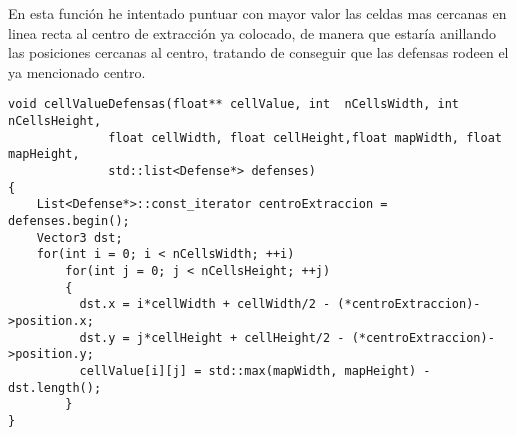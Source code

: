 En esta función he intentado puntuar con mayor valor las celdas mas cercanas en
linea recta al centro de extracción ya colocado, de manera que estaría anillando
las posiciones cercanas al centro, tratando de conseguir que las defensas rodeen
el ya mencionado centro.

\begin{lstlisting}
void cellValueDefensas(float** cellValue, int  nCellsWidth, int nCellsHeight,
              float cellWidth, float cellHeight,float mapWidth, float mapHeight,
              std::list<Defense*> defenses)
{
    List<Defense*>::const_iterator centroExtraccion = defenses.begin();
    Vector3 dst;
    for(int i = 0; i < nCellsWidth; ++i)
        for(int j = 0; j < nCellsHeight; ++j)
        {
          dst.x = i*cellWidth + cellWidth/2 - (*centroExtraccion)->position.x;
          dst.y = j*cellHeight + cellHeight/2 - (*centroExtraccion)->position.y;
          cellValue[i][j] = std::max(mapWidth, mapHeight) - dst.length();
        }
}
\end{lstlisting}
